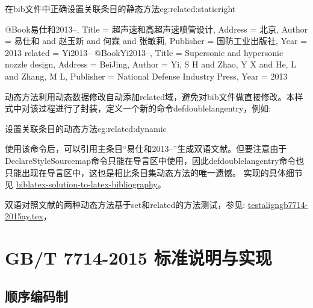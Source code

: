 \begin{example}{在bib文件中正确设置关联条目的静态方法}{eg:related:staticright}
\begin{texlist}
@Book{易仕和2013--,
  Title                    = {超声速和高超声速喷管设计},
  Address                  = {北京},
  Author                   = {易仕和 and 赵玉新 and 何霖 and 张敏莉},
  Publisher                = {国防工业出版社},
  Year                     = {2013}
  related                  = {Yi2013--}
}
@Book{Yi2013--,
  Title                    = {Supersonic and hypersonic nozzle design},
  Address                  = {BeiJing},
  Author                   = {Yi, S H and Zhao, Y X and He, L and Zhang, M L},
  Publisher                = {National Defense Industry Press},
  Year                     = {2013}
}
\end{texlist}
\end{example}

动态方法利用动态数据修改自动添加related域，避免对bib文件做直接修改。本样式中对该过程进行了封装，定义一个新的命令defdoublelangentry，例如:
\begin{example}{设置关联条目的动态方法}{eg:related:dynamic}
\begin{texlist}
\end{texlist}
\end{example}

使用该命令后，可以引用主条目“易仕和2013--”生成双语文献。但要注意由于DeclareStyleSourcemap命令只能在导言区中使用，因此defdoublelangentry命令也只能出现在导言区中，这也是相比条目集动态方法的唯一遗憾。
实现的具体细节见
\href{https://github.com/hushidong/biblatex-solution-to-latex-bibliography}%
{biblatex-solution-to-latex-bibliography}。

双语对照文献的两种动态方法基于set和related的方法测试，参见:
\href{run:./example/testaligngb7714-2015ay.tex}{testaligngb7714-2015ay.tex}，

\section{GB/T 7714-2015 标准说明与实现}

\subsection{顺序编码制}

